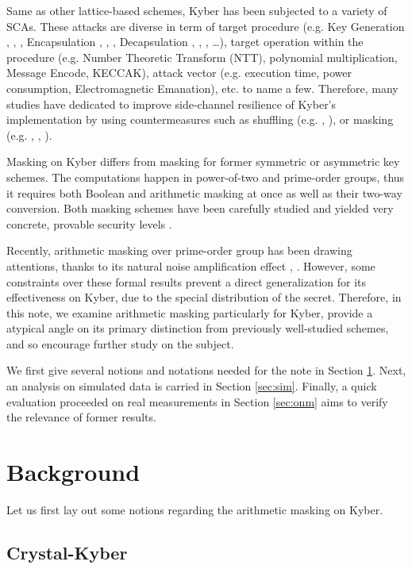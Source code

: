 \documentclass{llncs}
\begin{document}
Same as other lattice-based schemes, Kyber has been subjected to a variety of SCAs. These attacks are diverse in term of target procedure (e.g. Key Generation \cite{primas}, \cite{primas2}, \cite{liu}, Encapsulation \cite{menc1}, \cite{menc2}, \cite{menc3}, Decapsulation \cite{decaps1}, \cite{decaps2}, \cite{decaps3}, \dots), target operation within the procedure (e.g. Number Theoretic Transform (NTT), polynomial multiplication, Message Encode, KECCAK), attack vector (e.g. execution time, power consumption, Electromagnetic Emanation), etc. to name a few. Therefore, many studies have dedicated to improve side-channel resilience of Kyber's implementation by using countermeasures such as shuffling (e.g.  \cite{shuffling}, \cite{menc1}), or masking (e.g.  \cite{scr}, \cite{Kmask1}, \cite{Kmaskimp0}).



Masking on Kyber differs from masking for former symmetric or asymmetric key schemes. The computations happen in power-of-two and prime-order groups, thus it requires both Boolean and arithmetic masking at once as well as their two-way conversion. Both masking schemes have been carefully studied and yielded very concrete, provable security levels . 

Recently, arithmetic masking over prime-order group has been drawing attentions, thanks to its natural noise amplification effect \cite{optimalmask}, \cite{primemask}. However, some constraints over these formal results prevent a direct generalization for its effectiveness on Kyber, due to the special distribution of the secret. Therefore, in this note, we examine arithmetic masking particularly for Kyber, provide a atypical angle on its primary distinction from previously well-studied schemes, and so encourage further study on the subject.


We first give several notions and notations needed for the note in Section \ref{sec:bg}. Next, an analysis on simulated data is carried in Section \ref{sec:sim}. Finally, a quick evaluation proceeded on real measurements in Section \ref{sec:onm} aims to verify the relevance of former results.
\section{Background}\label{sec:bg}
Let us first lay out some notions regarding the arithmetic masking on Kyber.
\subsection{Crystal-Kyber}
\end{document}
